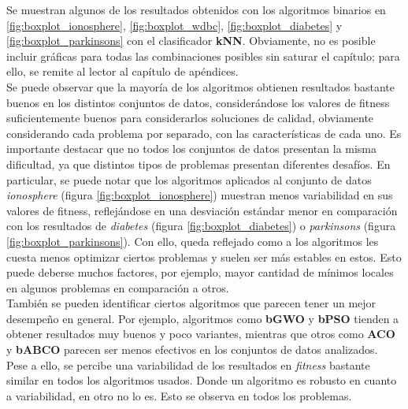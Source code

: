 Se muestran algunos de los resultados obtenidos con los algoritmos binarios en \ref{fig:boxplot_ionosphere}, \ref{fig:boxplot_wdbc}, \ref{fig:boxplot_diabetes} y \ref{fig:boxplot_parkinsons} con el clasificador \textbf{kNN}. Obviamente, no es posible incluir gráficas para todas las combinaciones posibles sin saturar el capítulo; para ello, se remite al lector al capítulo de apéndices.\\[6pt]
Se puede observar que la mayoría de los algoritmos obtienen resultados bastante buenos en los distintos conjuntos de datos, considerándose los valores de fitness suficientemente buenos para considerarlos soluciones de calidad, obviamente considerando cada problema por separado, con las características de cada uno. Es importante destacar que no todos los conjuntos de datos presentan la misma dificultad, ya que distintos tipos de problemas presentan diferentes desafíos. En particular, se puede notar que los algoritmos aplicados al conjunto de datos \textit{ionosphere} (figura \ref{fig:boxplot_ionosphere}) muestran menos variabilidad en sus valores de fitness, reflejándose en una desviación estándar menor en comparación con los resultados de \textit{diabetes} (figura \ref{fig:boxplot_diabetes}) o \textit{parkinsons} (figura \ref{fig:boxplot_parkinsons}). Con ello, queda reflejado como a los algoritmos les cuesta menos optimizar ciertos problemas y suelen ser más estables en estos. Esto puede deberse muchos factores, por ejemplo, mayor cantidad de mínimos locales en algunos problemas en comparación a otros.\\[6pt]
También se pueden identificar ciertos algoritmos que parecen tener un mejor desempeño en general. Por ejemplo, algoritmos como \textbf{bGWO} y \textbf{bPSO} tienden a obtener resultados muy buenos y poco variantes, mientras que otros como \textbf{ACO} y \textbf{bABCO} parecen ser menos efectivos en los conjuntos de datos analizados.\\[6pt]
Pese a ello, se percibe una variabilidad de los resultados en \textit{fitness} bastante similar en todos los algoritmos usados. Donde un algoritmo es robusto en cuanto a variabilidad, en otro no lo es. Esto se observa en todos los problemas.

